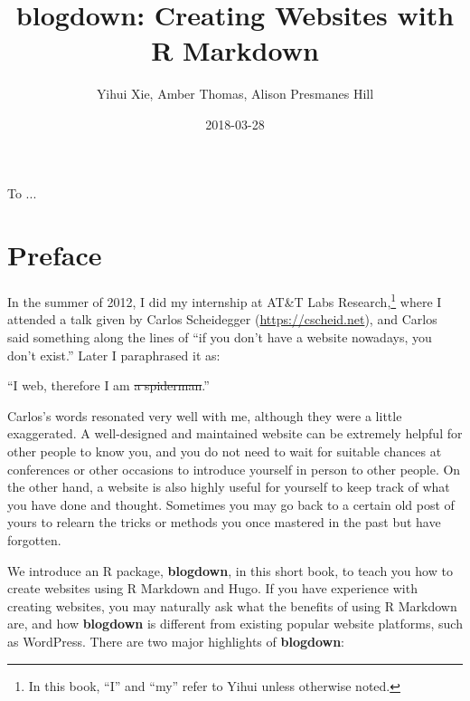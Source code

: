 \documentclass[12pt,]{krantz}
\title{blogdown: Creating Websites with R Markdown}
\author{Yihui Xie, Amber Thomas, Alison Presmanes Hill}
\date{2018-03-28}
\renewenvironment{quote}{\begin{VF}}{\end{VF}}
\theoremstyle{definition}
\theoremstyle{definition}
\theoremstyle{definition}
\theoremstyle{remark}
\begin{document}
\maketitle

\cleardoublepage\newpage\thispagestyle{empty}\null
\cleardoublepage\newpage\thispagestyle{empty}
\begin{center}
To ...
\end{center}

\setlength{\abovedisplayskip}{-5pt}
\frontmatter

{
\hypersetup{linkcolor=}
\setcounter{tocdepth}{2}
\tableofcontents
}
\listoftables
\listoffigures
\hypertarget{preface}{%
\chapter*{Preface}\label{preface}}


In the summer of 2012, I did my internship at AT\&T Labs
Research,\footnote{In this book, ``I'' and ``my'' refer to Yihui unless
  otherwise noted.} where I attended a talk given by Carlos Scheidegger
(\url{https://cscheid.net}), and Carlos said something along the lines
of ``if you don't have a website nowadays, you don't exist.'' Later I
paraphrased it as:

\begin{quote}
``I web, therefore I am \sout{a spiderman}.''
\end{quote}

Carlos's words resonated very well with me, although they were a little
exaggerated. A well-designed and maintained website can be extremely
helpful for other people to know you, and you do not need to wait for
suitable chances at conferences or other occasions to introduce yourself
in person to other people. On the other hand, a website is also highly
useful for yourself to keep track of what you have done and thought.
Sometimes you may go back to a certain old post of yours to relearn the
tricks or methods you once mastered in the past but have forgotten.

We introduce an R package, \textbf{blogdown}, in this short book, to
teach you how to create websites using R Markdown and Hugo. If you have
experience with creating websites, you may naturally ask what the
benefits of using R Markdown are, and how \textbf{blogdown} is different
from existing popular website platforms, such as WordPress. There are
two major highlights of \textbf{blogdown}:
\end{document}

